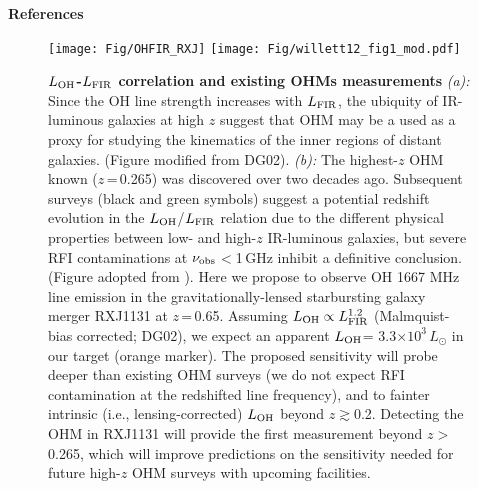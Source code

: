 \documentclass[letterpaper,11pt]{article}
\newcommand{\Lsun}{\mbox{$L_{\odot}$}\xspace}
\newcommand{\LFIR}{\mbox{$L_{\rm FIR}$}\xspace}
\newcommand{\LOH}{$L_{\rm OH}$\xspace}
\newcommand{\E}[1]{\mbox{$\times10^{#1}$}}
\newcommand{\eq}{\,=\,}
\begin{document}
\noindent \textbf{References}
{\fontsize{10pt}{12pt}\selectfont
    
}


\begin{figure}[ptbh]
\texttt{[image: Fig/OHFIR\_RXJ]} %
\texttt{[image: Fig/willett12\_fig1\_mod.pdf]}
\caption{{\bf \LOH-\LFIR correlation and existing OHMs measurements}
{\it (a):} Since the OH line strength increases with \LFIR,
the ubiquity of IR-luminous galaxies at high $z$ suggest that OHM may be a used as a proxy for
studying the kinematics of the inner regions of distant galaxies.
(Figure modified from DG02).
{\it (b):} The highest-$z$ OHM known ($z$\eq0.265) was discovered over two decades ago.
Subsequent surveys (black and green symbols) suggest a potential redshift evolution in the \LOH/\LFIR relation
due to the different physical properties between low- and high-$z$ IR-luminous galaxies, but 
severe RFI contaminations at $\nu_{\rm obs}$$<$1\,GHz inhibit a definitive conclusion. (Figure adopted from
\citealt{Willett12a}).
Here we propose to observe OH 1667 MHz line emission in the gravitationally-lensed starbursting
galaxy merger RXJ1131 at $z$\eq0.65.
Assuming $L_{\rm OH}\propto L_{\rm FIR}^{1.2}$ (Malmquist-bias corrected; DG02),
we expect an apparent \LOH= 3.3\E{3}\,\Lsun in our target (orange marker). The proposed sensitivity will
probe deeper than existing OHM surveys (we do not expect RFI contamination at the 
redshifted line frequency), 
and to fainter intrinsic (i.e., lensing-corrected) \LOH beyond $z$$\gtrsim$0.2.
Detecting the OHM in RXJ1131 will provide the first measurement beyond $z$$>$0.265,
which will improve predictions on the sensitivity needed for future high-$z$ OHM surveys with upcoming facilities.
\label{fig:model}}
\end{figure}
\end{document}
